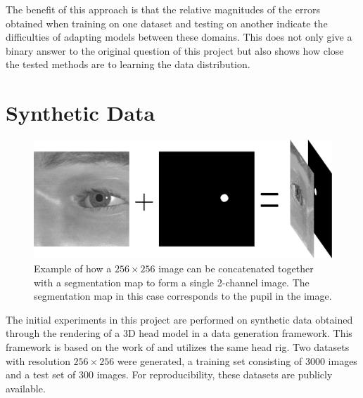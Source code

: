The benefit of this approach is that the relative magnitudes of the errors obtained when training on one dataset and testing on another indicate the difficulties of adapting models between these domains. This does not only give a binary answer to the original question of this project but also shows how close the tested methods are to learning the data distribution. %


\section{Synthetic Data}
\begin{figure}[t]
    \centering
    \includegraphics[width=\textwidth]{images/misc/2-channel_img_example2.pdf}
    \caption{Example of how a $256\times256$ image can be concatenated together with a segmentation map to form a single 2-channel image. The segmentation map in this case corresponds to the pupil in the image.}
    \label{fig:2channels}
\end{figure}

The initial experiments in this project are performed on synthetic data obtained through the rendering of a 3D head model in a data generation framework. This framework is based on the work of \textcite{swirski2014rendering} and utilizes the same head rig. Two datasets with resolution $256\times256$ were generated, a training set consisting of $3000$ images and a test set of $300$ images. For reproducibility, these datasets are publicly available.

